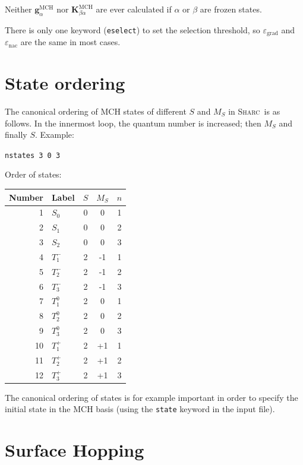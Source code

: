 \documentclass[a4paper,11pt,DIV=15,openany,twoside=false]{scrbook}
\newcommand{\sharc}{\textsc{Sharc}}
\newcommand{\ttt}[1]{\texttt{#1}}
\renewcommand{\vec}[1]{\ensuremath{\mathbf{#1}}}
\newenvironment{example}{
  \vspace{0mm}
  \definecolor{shadecolor}{HTML}{BBDDFF}
  \begin{shaded}
  \begin{minipage}{0.9\textwidth}
}{
  \end{minipage}
  \end{shaded}
}
\begin{document}
Neither $\vec{g}^{\text{MCH}}_\alpha$ nor $\vec{K}^{\text{MCH}}_{\beta\alpha}$ are ever calculated if $\alpha$ or $\beta$ are frozen states.

There is only one keyword (\ttt{eselect}) to set the selection threshold, so $\varepsilon_\text{grad}$ and $\varepsilon_\text{nac}$ are the same in most cases. 


\section{State ordering}\label{met:ordering}

The canonical ordering of MCH states of different $S$ and $M_S$ in \sharc\ is as follows. In the innermost loop, the quantum number is increased; then $M_S$ and finally $S$. Example:

  \verb|nstates 3 0 3|

  Order of states:

  \begin{tabular}{rlccc}
    \toprule
    Number      &Label       &$S$ &$M_S$  &$n$\\
    \midrule
    1&$S_0$       &0&0&1\\
    2&$S_1$       &0&0&2\\
    3&$S_2$       &0&0&3\\
    4&$T_1^-$       &2&-1&1\\
    5&$T_2^-$       &2&-1&2\\
    6&$T_3^-$       &2&-1&3\\
    7&$T_1^0$       &2&0&1\\
    8&$T_2^0$       &2&0&2\\
    9&$T_3^0$       &2&0&3\\
    10&$T_1^+$       &2&+1&1\\
    11&$T_2^+$       &2&+1&2\\
    12&$T_3^+$       &2&+1&3\\
    \bottomrule
  \end{tabular}

The canonical ordering of states is for example important in order to specify the initial state in the MCH basis (using the \ttt{state} keyword in the input file).


\section{Surface Hopping}
\end{document}
